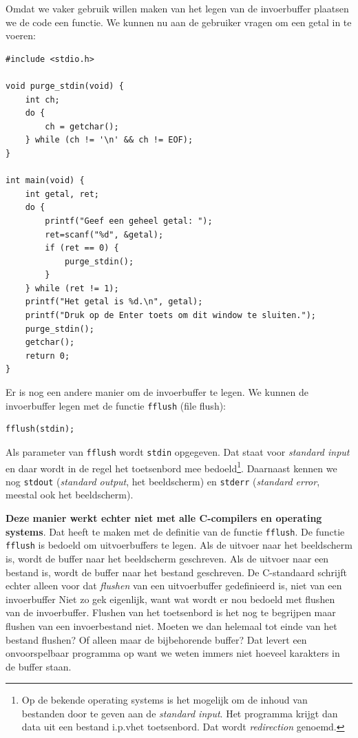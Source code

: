 \documentclass[a4paper,10pt,fleqn,twoside]{article}
\begin{document}
Omdat we vaker gebruik willen maken van het legen van de invoerbuffer plaatsen we de code een functie. We kunnen nu aan de gebruiker vragen om een getal in te voeren:

\begin{lstlisting}
#include <stdio.h>

void purge_stdin(void) {
    int ch;
    do {
        ch = getchar();
    } while (ch != '\n' && ch != EOF);
}

int main(void) {
    int getal, ret;
    do {
        printf("Geef een geheel getal: ");
        ret=scanf("%d", &getal);
        if (ret == 0) {
            purge_stdin();
        }
    } while (ret != 1);
    printf("Het getal is %d.\n", getal);
    printf("Druk op de Enter toets om dit window te sluiten.");
    purge_stdin();
    getchar();
    return 0;
}
\end{lstlisting}

Er is nog een andere manier om de invoerbuffer te legen. We kunnen de invoerbuffer legen met de functie \lstinline|fflush| (file flush):

\begin{lstlisting}
fflush(stdin);
\end{lstlisting}

Als parameter van \lstinline|fflush| wordt \lstinline|stdin| opgegeven. Dat staat voor \textsl{standard input} en daar wordt in de regel het toetsenbord mee bedoeld\footnote{Op de bekende operating systems is het mogelijk om de inhoud van bestanden door te geven aan de \textsl{standard input}. Het programma krijgt dan data uit een bestand i.p.v\@ het toetsenbord. Dat wordt \textsl{redirection} genoemd.}. Daarnaast kennen we nog \lstinline|stdout| (\textsl{standard output}, het beeldscherm) en \lstinline|stderr| (\textsl{standard error}, meestal ook het beeldscherm).
 
\textbf{Deze manier werkt echter niet met alle C-compilers en operating systems}. Dat heeft te maken met de definitie van de functie \lstinline|fflush|. De functie \lstinline|fflush| is bedoeld om uitvoerbuffers te legen. Als de uitvoer naar het beeldscherm is, wordt de buffer naar het beeldscherm geschreven. Als de uitvoer naar een bestand is, wordt de buffer naar het bestand geschreven. De C-standaard schrijft echter alleen voor dat \textsl{flushen} van een uitvoerbuffer gedefinieerd is, niet van een invoerbuffer Niet zo gek eigenlijk, want wat wordt er nou bedoeld met flushen van de invoerbuffer. Flushen van het toetsenbord is het nog te begrijpen maar flushen van een invoerbestand niet. Moeten we dan helemaal tot einde van het bestand flushen? Of alleen maar de bijbehorende buffer? Dat levert een onvoorspelbaar programma op want we weten immers niet hoeveel karakters in de buffer staan.
\end{document}
